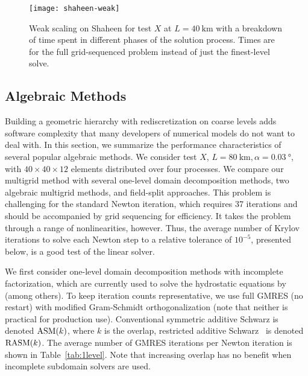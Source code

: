 \begin{figure}
  \centering\texttt{[image: shaheen-weak]}
  \caption{Weak scaling on Shaheen for test $X$ at $L=\SI{40}{\kilo\metre}$ with a breakdown of time spent in different phases of the solution process.
    Times are for the full grid-sequenced problem instead of just the finest-level solve.}\label{fig:shaheen-weak}
\end{figure}

\subsection{Algebraic Methods}\label{sec:1level}
Building a geometric hierarchy with rediscretization on coarse levels adds software complexity that many developers of numerical models do not want to deal with.  In this section, we summarize the performance characteristics of several popular algebraic methods.  We consider test $X$, $L = \SI{80}{\kilo\metre}, \alpha=\SI{0.03}{\degree}$, with $40\times 40\times 12$ elements distributed over four processes. We compare our multigrid method with several one-level domain decomposition methods, two algebraic multigrid methods, and field-split approaches. This problem is challenging for the standard Newton iteration, which requires 37 iterations and should be accompanied by grid sequencing for efficiency. It takes the problem through a range of nonlinearities, however. Thus, the average number of Krylov iterations to solve each Newton step to a relative tolerance of $10^{-5}$, presented below, is a good test of the linear solver.

We first consider one-level domain decomposition methods with incomplete factorization, which are currently used to solve the hydrostatic equations by \citep{seacism,larour2012continental} (among others).  To keep iteration counts representative, we use full GMRES (no restart) with modified Gram-Schmidt orthogonalization (note that neither is practical for production use).  Conventional symmetric additive Schwarz is denoted $\mathrm{ASM}(k)$, where $k$ is the overlap, restricted additive Schwarz~\citep{cai1999restricted} is denoted $\mathrm{RASM}(k)$.  The average number of GMRES iterations per Newton iteration is shown in Table~\ref{tab:1level}.  Note that increasing overlap has no benefit when incomplete subdomain solvers are used.

